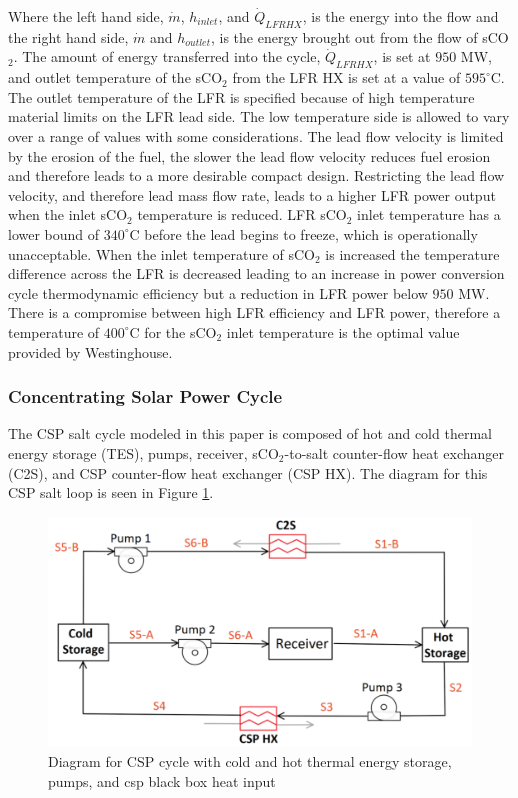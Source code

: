 \begin{paracol}{2}
Where the left hand side, $\dot{m}$, $h_{inlet}$, and $\dot{Q}_{LFRHX}$, is the energy into the flow and the right hand side, $\dot{m}$ and $h_{outlet}$, is the energy brought out from the flow of sCO$_2$. The amount of energy transferred into the cycle, $\dot{Q}_{LFRHX}$, is set at $950$ MW, and outlet temperature of the sCO$_2$ from the LFR HX is set at a value of $595^{\circ}$C. The outlet temperature of the LFR is specified because of high temperature material limits on the LFR lead side. The low temperature side is allowed to vary over a range of values with some considerations. The lead flow velocity is limited by the erosion of the fuel, the slower the lead flow velocity reduces fuel erosion and therefore leads to a more desirable compact design. Restricting the lead flow velocity, and therefore lead mass flow rate, leads to a higher LFR power output when the inlet sCO$_2$ temperature is reduced. LFR sCO$_2$ inlet temperature has a lower bound of $340^{\circ}$C before the lead begins to freeze, which is operationally unacceptable. When the inlet temperature of sCO$_2$ is increased the temperature difference across the LFR is decreased leading to an increase in power conversion cycle thermodynamic efficiency but a reduction in LFR power below $950$ MW. There is a compromise between high LFR efficiency and LFR power, therefore a temperature of $400^{\circ}$C for the sCO$_2$ inlet temperature is the optimal value provided by Westinghouse.


\subsubsection{Concentrating Solar Power Cycle}

The CSP salt cycle modeled in this paper is composed of hot and cold thermal energy storage (TES), pumps, receiver, sCO$_2$-to-salt counter-flow heat exchanger (C2S), and CSP counter-flow heat exchanger (CSP HX). The diagram for this CSP salt loop is seen in Figure \ref{csp}. 



\begin{figure}[h] 
    \widefigure
    \includegraphics[width=10 cm]{Definitions/csp.pdf}
    \caption{Diagram for CSP cycle with cold and hot thermal energy storage, pumps, and csp black box heat input\label{csp}}
\end{figure}


\end{paracol}
